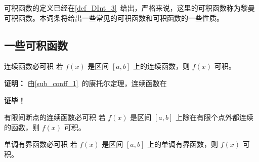 可积函数的定义已经在\autoref{def_DInt_3}~给出，严格来说，这里的可积函数称为黎曼可积函数。本词条将给出一些常见的可积函数和可积函数的一些性质。
\subsection{一些可积函数}
\begin{theorem}{连续函数必可积}
若 $f(x)$ 是区间 $[a,b]$ 上的连续函数，则 $f(x)$ 可积。
\end{theorem}
\textbf{证明：}
由\autoref{sub_conff_1}~的康托尔定理，连续函数在

\textbf{证毕！}

\begin{theorem}{有限间断点的连续函数必可积}
若 $f(x)$ 是区间 $[a,b]$ 上除在有限个点外都连续的函数，则 $f(x)$ 可积。
\end{theorem}

\begin{theorem}{单调有界函数必可积}
若 $f(x)$ 是区间 $[a,b]$ 上的单调有界函数，则 $f(x)$ 可积。
\end{theorem}